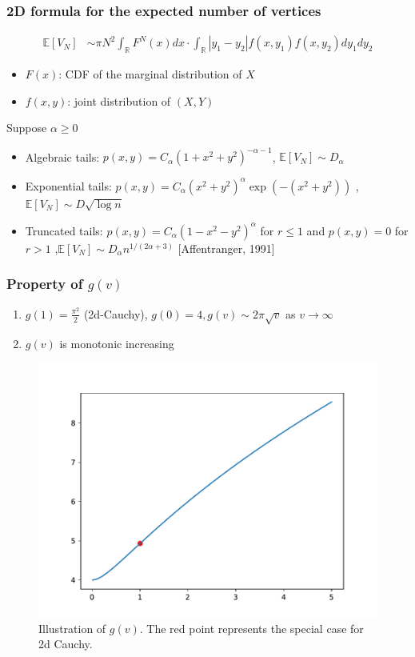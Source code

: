 \documentclass{beamer}
\def\E{\mathbb{E}}
\def\R{\mathbb{R}}
\begin{document}
\begin{frame}
    \frametitle{
        2D formula for the expected number of vertices
    }
    \begin{align*}
        \E[V_N]
        & \sim \pi N^2 \int_{\R} F^{N}(x) dx \cdot \int_{\R} |y_1-y_2| f(x, y_1) f(x,y_2)dy_1dy_2
    \end{align*}
    \begin{itemize}
        \item $F(x)$: CDF of the marginal distribution of $X$
        \item $f(x,y)$: joint distribution of $(X,Y)$
    \end{itemize}
    Suppose $\alpha \geq 0$
    \begin{itemize}
        \item Algebraic tails: $p(x,y) = C_{\alpha}(1+x^2+y^2)^{-\alpha-1}$,
        $\E[V_N] \sim D_{\alpha}$
        \item Exponential tails: $p(x,y) = C_{\alpha}(x^2+y^2)^{\alpha} \exp(-(x^2+y^2))$
        ,$\E[V_N] \sim D \sqrt{\log n}$
        \item Truncated tails: $p(x,y) = C_{\alpha}(1-x^2-y^2)^{\alpha}$ for $r\leq 1$ and $p(x,y)=0$ for $r>1$
        ,$\E[V_N] \sim D_{\alpha} n^{1/(2\alpha + 3)}$ [Affentranger, 1991]
    \end{itemize}
\end{frame}
\begin{frame}
    \frametitle{Property of $g(v)$}
    \begin{enumerate}
        \item $g(1)=\frac{\pi^2}{2}$
        (2d-Cauchy), $g(0)=4,
        g(v) \sim 2\pi \sqrt{v}$
        as $v\to \infty$
        \item $g(v)$ is monotonic increasing
    \end{enumerate}
    \begin{figure}
        \includegraphics[width=0.6\linewidth]{2d_t_distribution_g_v.pdf}
        \caption{Illustration of $g(v)$. The red point represents the special case for 2d Cauchy.}
    \end{figure}
\end{frame}
\end{document}

